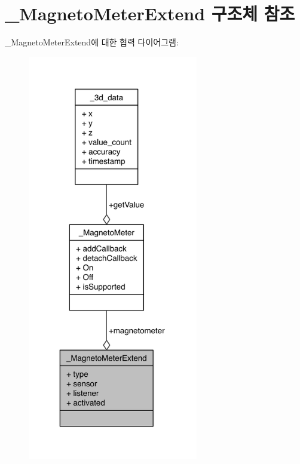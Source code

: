 \hypertarget{struct__MagnetoMeterExtend}{\section{\-\_\-\-Magneto\-Meter\-Extend 구조체 참조}
\label{struct__MagnetoMeterExtend}
}


\-\_\-\-Magneto\-Meter\-Extend에 대한 협력 다이어그램\-:\nopagebreak
\begin{figure}[H]
\begin{center}
\leavevmode
\includegraphics[width=211pt]{d3/d9a/struct__MagnetoMeterExtend__coll__graph}
\end{center}
\end{figure}
